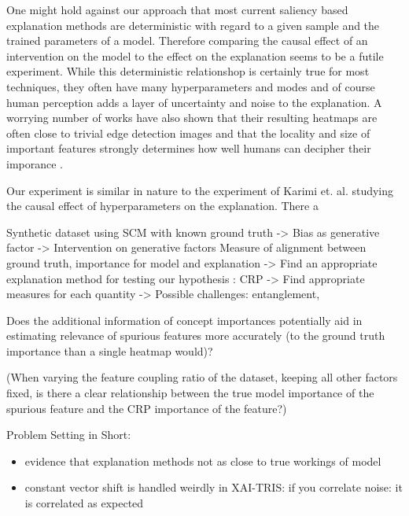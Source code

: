 {One might hold against our approach that most current saliency based explanation methods are deterministic with regard to a given sample and the trained parameters of a model. Therefore comparing the causal effect of an intervention on the model to the effect on the explanation seems to be a futile experiment. While this deterministic relationshop is certainly true for most techniques, they often have many hyperparameters and modes and of course human perception adds a layer of uncertainty and noise to the explanation. A worrying number of works  have also shown that their resulting heatmaps are often close to trivial edge detection images  and that the locality and size of important features strongly determines how well humans can decipher their imporance .


Our experiment is similar in nature to the experiment of Karimi et. al. \cite{Karimi2023} studying the causal effect of hyperparameters on the explanation.
There a

Synthetic dataset using SCM with known ground truth
-> Bias as generative factor
-> Intervention on generative factors
Measure of alignment between ground truth, importance for model and explanation
-> Find an appropriate explanation method for testing our hypothesis : CRP
-> Find appropriate measures for each quantity
-> Possible challenges: entanglement,


Does the additional information of concept importances potentially aid in estimating
relevance of spurious features  more accurately (to the ground truth importance than a single heatmap would)?


(When varying the feature coupling ratio of the dataset, keeping all other factors fixed, is there a clear relationship between the true model importance of the spurious feature and the CRP importance of the feature?)



Problem Setting in Short:

\begin{itemize}
    \item evidence that explanation methods not as close to true workings of model
    \item constant vector shift is handled weirdly in XAI-TRIS: if you correlate noise: it is correlated as expected
\end{itemize}


}
